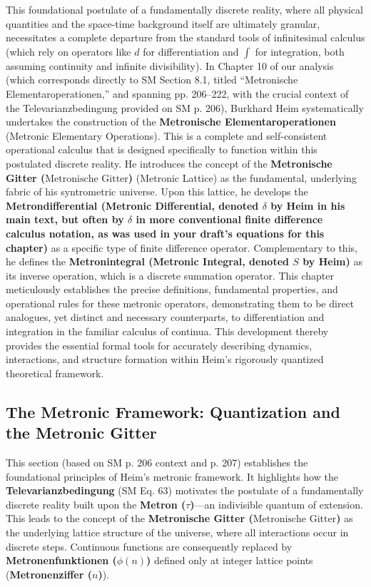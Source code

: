 \documentclass[12pt]{article}
\newcommand{\q}[1]{\enquote{#1}}
\newcommand{\metron}{\tau}
\newcommand{\metronischegitter}{\text{Metronische Gitter}}
\newcommand{\metrondifferential}{\delta}
\newcommand{\metronintegral}{S}
\newcommand{\metronenfunktion}{\phi(n)}
\newcommand{\metronenziffer}{n}
\begin{document}
This foundational postulate of a fundamentally discrete reality, where all physical quantities and the space-time background itself are ultimately granular, necessitates a complete departure from the standard tools of infinitesimal calculus (which rely on operators like \( d \) for differentiation and \( \int \) for integration, both assuming continuity and infinite divisibility). In Chapter 10 of our analysis (which corresponds directly to SM Section 8.1, titled \q{Metronische Elementaroperationen,} and spanning pp. 206–222, with the crucial context of the Televarianzbedingung provided on SM p. 206), Burkhard Heim systematically undertakes the construction of the \textbf{Metronische Elementaroperationen} (Metronic Elementary Operations). This is a complete and self-consistent operational calculus that is designed specifically to function within this postulated discrete reality. He introduces the concept of the \textbf{Metronische Gitter (\(\metronischegitter\))} (Metronic Lattice) as the fundamental, underlying fabric of his syntrometric universe. Upon this lattice, he develops the \textbf{Metrondifferential (Metronic Differential, denoted \( \metrondifferential \) by Heim in his main text, but often by \( \delta \) in more conventional finite difference calculus notation, as was used in your draft's equations for this chapter)} as a specific type of finite difference operator. Complementary to this, he defines the \textbf{Metronintegral (Metronic Integral, denoted \( \metronintegral \) by Heim)} as its inverse operation, which is a discrete summation operator. This chapter meticulously establishes the precise definitions, fundamental properties, and operational rules for these metronic operators, demonstrating them to be direct analogues, yet distinct and necessary counterparts, to differentiation and integration in the familiar calculus of continua. This development thereby provides the essential formal tools for accurately describing dynamics, interactions, and structure formation within Heim’s rigorously quantized theoretical framework.

\subsection{The Metronic Framework: Quantization and the Metronic Gitter}
\label{sec:metronic_framework}

This section (based on SM p. 206 context and p. 207) establishes the foundational principles of Heim's metronic framework. It highlights how the \textbf{Televarianzbedingung} (SM Eq. 63) motivates the postulate of a fundamentally discrete reality built upon the \textbf{Metron (\(\metron\))}—an indivisible quantum of extension. This leads to the concept of the \textbf{Metronische Gitter (\(\metronischegitter\))} as the underlying lattice structure of the universe, where all interactions occur in discrete steps. Continuous functions are consequently replaced by \textbf{Metronenfunktionen (\(\metronenfunktion\))} defined only at integer lattice points (\textbf{Metronenziffer (\(\metronenziffer\))}).
\end{document}
